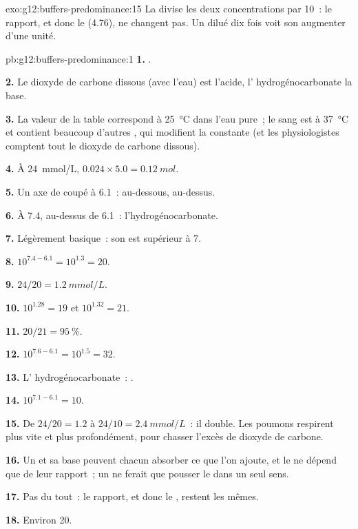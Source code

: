\begin{solution}{exo:g12:buffers-predominance:15}
La  divise les deux concentrations par 10~: le rapport, et donc
le  (4.76), ne changent pas. Un  dilué dix fois voit son 
augmenter d'une unité.
\end{solution}

\begin{solution}{pb:g12:buffers-predominance:1}
\textbf{1.} .

\textbf{2.} Le dioxyde de carbone dissous (avec l'eau) est l'acide,
l' hydrogénocarbonate la base.

\textbf{3.} La valeur de la table correspond à \qty{25}{\celsius} dans
l'eau pure~; le sang est à \qty{37}{\celsius} et contient beaucoup
d'autres , qui modifient la constante (et les physiologistes
comptent tout le dioxyde de carbone dissous).

\textbf{4.} À \qty{24}{mmol/L}, $0.024 \times 5.0 = \qty{0.12}{mol}$.

\textbf{5.} Un axe de  coupé à 6.1~:  au-dessous, 
au-dessus.

\textbf{6.} À 7.4, au-dessus de 6.1~: l'hydrogénocarbonate.

\textbf{7.} Légèrement basique~: son  est supérieur à 7.

\textbf{8.} $10^{7.4 - 6.1} = 10^{1.3} = 20$.

\textbf{9.} $24 / 20 = \qty{1.2}{mmol/L}$.

\textbf{10.} $10^{1.28} = 19$ et $10^{1.32} = 21$.

\textbf{11.} $20/21 = \qty{95}{\percent}$.

\textbf{12.} $10^{7.6 - 6.1} = 10^{1.5} = 32$.

\textbf{13.} L' hydrogénocarbonate~:
.

\textbf{14.} $10^{7.1 - 6.1} = 10$.

\textbf{15.} De $24/20 = 1.2$ à $24/10 = \qty{2.4}{mmol/L}$~: il double.
Les poumons respirent plus vite et plus profondément, pour chasser
l'excès de dioxyde de carbone.

\textbf{16.} Un  et sa base peuvent chacun absorber ce que
l'on ajoute, et le  ne dépend que de leur rapport~; un  ne
ferait que pousser le  dans un seul sens.

\textbf{17.} Pas du tout~: le rapport, et donc le , restent les mêmes.

\textbf{18.} Environ 20.
\end{solution}
